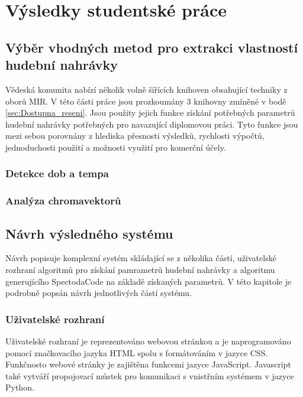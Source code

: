 \chapter{Výsledky studentské práce}



\section{Výběr vhodných metod pro extrakci vlastností hudební nahrávky} \label{sec:Exktrakce_vlastnosti_metody}

Vědeská komunita nabízí několik volně šířících knihoven obsahující techniky z oborů MIR. V této části práce jsou prozkoumány 3 knihovny zmíněné v bodě \ref{sec:Dostupna_reseni}. Jsou použity jejich funkce získání potřebných parametrů hudební nahrávky potřebných pro navazující diplomovou práci. Tyto funkce jsou mezi sebou porovnány z hlediska přesnosti výsledků, rychlosti výpočtů, jednoduchosti použití a možnosti využití pro komerční účely. 

\subsection{Detekce dob a tempa}



\subsection{Analýza chromavektorů}



\section{Návrh výsledného systému}

Návrh popisuje komplexní systém skládající se z několika částí, uživatelské rozhraní algoritmů pro získání pamrametrů hudební nahrávky a algoritmu generujícího SpectodaCode na základě získaných parametrů. V této kapitole je podrobně popsán návrh jednotlivých částí systému. 

\subsection{Uživatelské rozhraní}

Uživatelské rozhraní je reprezentováno webovou stránkou a je naprogramováno pomocí značkovacího jazyka \acs{HTML} spolu s formátováním v jazyce CSS. Funkčnosto webové stránky je zajištěna funkcemi jazyce JavaScript. Javascript také vytváří propojovací můstek pro komunikaci s vnistřním systémem v jazyce Python.

